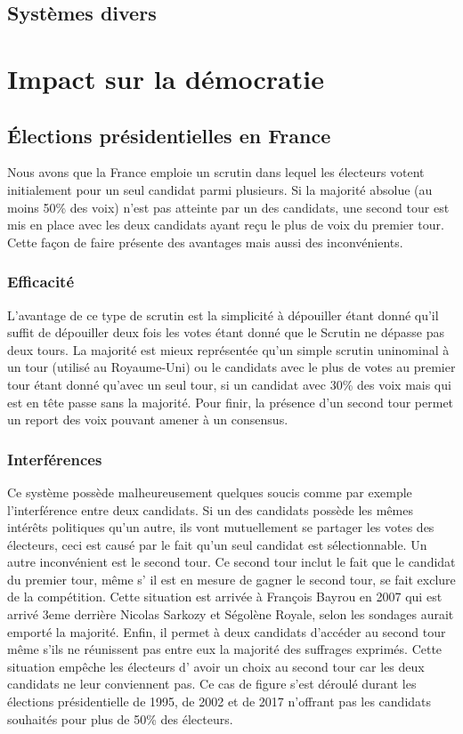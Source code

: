 \documentclass[12pt,a4paper]{report}
\begin{document}
\section{Systèmes divers} %


\chapter{Impact sur la démocratie}

\section{Élections présidentielles en France}
Nous avons que la France emploie un scrutin dans lequel les électeurs votent initialement pour un seul candidat parmi plusieurs.
Si la majorité absolue (au moins 50\% des voix) n’est pas atteinte par un des candidats, une second tour est mis en place avec les deux candidats ayant reçu le plus de voix du premier tour.\nocite{wiki:scrutinuni2tours}
Cette façon de faire présente des avantages mais aussi des inconvénients.

\subsection{Efficacité}

L’avantage de ce type de scrutin est la simplicité à dépouiller étant donné qu’il suffit de dépouiller deux fois les votes étant donné que le Scrutin ne dépasse pas deux tours.
La majorité est mieux représentée qu’un simple scrutin uninominal à un tour (utilisé au Royaume-Uni) ou le candidats avec le plus de votes au premier tour étant donné qu’avec un seul tour, si un candidat avec 30\% des voix mais qui est en tête passe sans la majorité.
Pour finir, la présence d'un second tour permet un report des voix pouvant amener à un consensus.

\subsection{Interférences}

Ce système possède malheureusement quelques soucis comme par exemple l'interférence entre deux candidats.
Si un des candidats possède les mêmes intérêts politiques qu’un autre, ils vont mutuellement se partager les votes des électeurs, ceci est causé par le fait qu’un seul candidat est sélectionnable.
Un autre inconvénient est le second tour.
Ce second tour inclut le fait que le candidat du premier tour, même s' il est en mesure de gagner le second tour, se fait exclure de la compétition.
Cette situation est arrivée à François Bayrou en 2007 qui est arrivé 3eme derrière Nicolas Sarkozy et Ségolène Royale, selon les sondages aurait emporté la majorité.
Enfin, il permet à deux candidats d'accéder au second tour même s'ils ne réunissent pas entre eux la majorité des suffrages exprimés.
Cette situation empêche les électeurs d' avoir un choix au second tour car les deux candidats ne leur conviennent pas.
Ce cas de figure s’est déroulé durant les élections présidentielle de 1995, de 2002 et de 2017 n’offrant pas les candidats souhaités pour plus de 50\% des électeurs.
\end{document}

